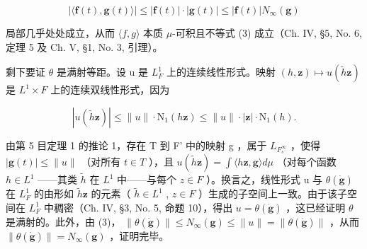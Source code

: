 \[
| \langle \mathbf {f} (t), \mathbf {g} (t) \rangle | \leqslant | \mathbf {f} (t) | \cdot | \mathbf {g} (t) | \leqslant | \mathbf {f} (t) | N _ {\infty} (\mathbf {g})
\]

局部几乎处处成立，从而 \(\langle f,g\rangle\) 本质 \(\mu\)-可积且不等式 (3) 成立（Ch. IV, §5, No. 6, 定理 5 及 Ch. V, §1, No. 3, 引理）。

剩下要证 \(\theta\) 是满射等距。设 u 是 \(L_{F}^{1}\) 上的连续线性形式。映射 \((h,\mathbf{z})\mapsto u(\widetilde{h}\mathbf{z})\) 是 \(L^{1}\times F\) 上的连续双线性形式，因为

\[
\left| u \left(\widetilde {h} \mathbf {z}\right) \right| \leqslant \| u \| \cdot \mathrm{N} _ {1} (h \mathbf {z}) \leqslant \| u \| \cdot | \mathbf {z} | \cdot \mathrm{N} _ {1} (h).
\]

由第 5 目定理 1 的推论 1，存在 T 到 F' 中的映射 g ，属于 \(L_{F_{s}^{\infty}}\) ，使得 \(|\mathbf{g}(t)| \leqslant \|u\|\) （对所有 \(t \in T\) ），且 \(u(\widetilde{h}\mathbf{z}) = \int \langle h\mathbf{z}, \mathbf{g} \rangle d\mu\) （对每个函数 \(h \in L^{1}\) ——其类 \(\widetilde{h}\) 在 \(L^{1}\) 中——与每个 \(z \in F\) ）。换言之，线性形式 u 与 \(\theta(\dot{\mathbf{g}})\) 在 \(L_{F}^{1}\) 的由形如 \(\widetilde{h}\mathbf{z}\) 的元素（ \(\widetilde{h} \in L^{1}\) , \(z \in F\) ）生成的子空间上一致。由于该子空间在 \(L_{F}^{1}\) 中稠密（Ch. IV, §3, No. 5, 命题 10），得出 \(u = \theta(\dot{\mathbf{g}})\) ，这已经证明 \(\theta\) 是满射的。此外，由 (3)， \(\|\theta(\dot{\mathbf{g}})\| \leqslant N_{\infty}(\mathbf{g}) \leqslant \|u\| = \|\theta(\dot{\mathbf{g}})\|\) ，从而 \(\|\theta(\dot{\mathbf{g}})\| = N_{\infty}(\mathbf{g})\) ，证明完毕。
